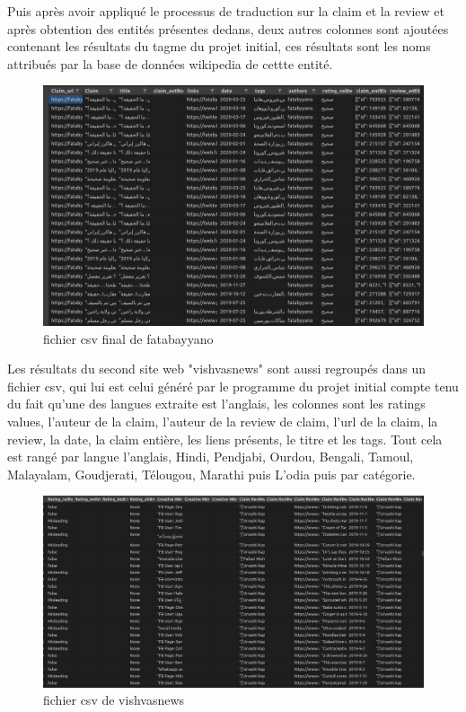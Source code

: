 \documentclass[oneside,13pt,a4paper]{report}
\begin{document}
Puis après avoir appliqué le processus de traduction sur la claim et la review et après obtention des entités présentes dedans, deux autres colonnes sont ajoutées contenant les résultats du tagme du projet initial, ces résultats sont les noms attribués par la base de données wikipedia de cettte entité.
\begin{figure}[h]
	\centering
	\begin{minipage}[c]{.5\linewidth}
\includegraphics[width=1\textwidth]{img/fatab2.png}
\caption{fichier csv final de fatabayyano}
	\end{minipage}
\end{figure}

Les résultats du second site web "vishvasnews" sont aussi regroupés dans un fichier csv, qui lui est celui généré par le programme du projet initial compte tenu du fait qu'une des langues extraite est l'anglais, les colonnes sont les ratings values, l'auteur de la claim, l'auteur de la review de claim, l'url de la claim, la review, la date, la claim entière, les liens présents, le titre et les tags. Tout cela est rangé par langue l'anglais, Hindi, Pendjabi, Ourdou, Bengali, Tamoul, Malayalam, Goudjerati, Télougou, Marathi puis L'odia puis par catégorie.
\begin{figure}[h]
	\centering
	\begin{minipage}[c]{.5\linewidth}
\includegraphics[width=1\textwidth]{img/vishvas.png}
\caption{fichier csv de vishvasnews}
	\end{minipage}
\end{figure}
\end{document}

